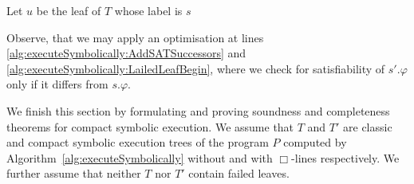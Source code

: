 \documentclass{sig-alternate}%
\begin{document}
\begin{algorithm}[!t]
{{                    \label{alg:executeSymbolically:ClassicStep}
            }
            Let $u$ be the leaf of $T$ whose label is $s$ \;
                    \label{alg:executeSymbolically:GetLeaf}
    } \label{alg:executeSymbolically:LoopEnd}
     \;
\end{algorithm}

Observe, that we may apply an optimisation at lines
\ref{alg:executeSymbolically:AddSATSuccessors} and
\ref{alg:executeSymbolically:LailedLeafBegin}, where we check for
satisfiability of $s'.\varphi$ only if it differs from $s.\varphi$.

We finish this section by formulating and proving soundness and
completeness theorems for compact symbolic execution. We assume that
$T$ and $T'$ are classic and compact symbolic execution trees of the
program $P$ computed by Algorithm~\ref{alg:executeSymbolically}
without and with $\Box$-lines respectively. We further assume that
neither $T$ nor $T'$ contain failed leaves.
\end{document}

